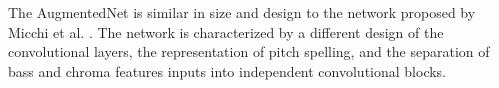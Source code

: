
The AugmentedNet is similar in size and design to the network proposed by Micchi et al. \cite{micchi2020not}. The network is characterized by a different design of the convolutional layers, the representation of pitch spelling, and the separation of bass and chroma features inputs into independent convolutional blocks.
